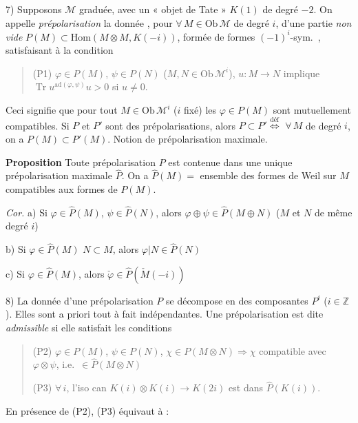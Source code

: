 \documentclass[11pt,a4paper]{article}
\begin{document}
7)  Supposons $\mathcal{M}$ graduée, avec un « objet de
Tate » $K(1)$ de degré $-2$. On appelle \emph{prépolarisation}  la donnée \struck{\ill{}}, pour $\forall\, M \in \mathrm{Ob}\,
\mathcal{M}$ de degré $i$, d'une partie \emph{non vide} \struck{\ill{}}
$P(M) \subset \mathrm{Hom}(M \otimes M, K(-i))$, formée de formes
$(-1)^{i}$-sym.\ , satisfaisant à la condition
\begin{quote}
(P1) $\varphi \in P(M)$, $\psi \in P(N)$ ($M, N \in \mathrm{Ob}\,
\mathcal{M}^{i}$), $u \colon M \to N$ implique
$\operatorname{Tr} u^{\mathrm{ad}(\varphi,\psi)} u > 0$ si $u \neq 0$.
\end{quote}
Ceci signifie que pour tout $M \in \mathrm{Ob}\,\mathcal{M}^{i}$ ($i$ fixé)
les $\varphi \in P(M)$ sont mutuellement compatibles.
Si $P$ et $P'$ sont des prépolarisations, alors
$P \subset P' \overset{\text{déf}}{\Longleftrightarrow}$ $\forall\, M$ de
degré $i$, on a $P(M) \subset P'(M)$. Notion de prépolarisation maximale.

\textbf{Proposition} Toute prépolarisation $P$ est contenue dans une unique
prépolarisation maximale $\widehat{P}$. On a $\widehat{P}(M) =$ ensemble des
formes de Weil sur $M$ compatibles aux formes de $P(M)$.

\emph{Cor.} a) Si $\varphi \in \widehat{P}(M)$, $\psi \in \widehat{P}(N)$,
alors $\varphi \oplus \psi \in \widehat{P}(M \oplus N)$ ($M$ et $N$ de même
degré $i$)

b) Si $\varphi \in \widehat{P}(M)$ \struck{\ill{}} $N \subset M$, alors
$\varphi|N \in \widehat{P}(N)$

c) Si $\varphi \in \widehat{P}(M)$, alors
$\check{\varphi} \in \widehat{P}(\check{M}(-i))$

8)  La donnée d'une prépolarisation $P$ se décompose en des
composantes $P^{i}$ ($i \in \mathbb{Z}$). Elles sont a priori tout à fait
indépendantes. Une prépolarisation est dite \emph{admissible} si elle
satisfait les conditions
\begin{quote}
(P2) $\varphi \in P(M)$, $\psi \in P(N)$, $\chi \in P(M \otimes N)
\Longrightarrow \chi$ compatible avec $\varphi \otimes \psi$, i.e.\
$\in \widehat{P}(M \otimes N)$

(P3) $\forall\, i$, l'iso can $K(i) \otimes K(i) \to K(2i)$ \struck{\ill{}} est
dans $\widehat{P}(K(i))$.
\end{quote}
En présence de (P2), (P3) équivaut à :
\struck{(P3)$_0$ l'iso can $K(1) \otimes K(1) \to K(2)$ est dans
$\widehat{P}(K(1))$}
\end{document}
